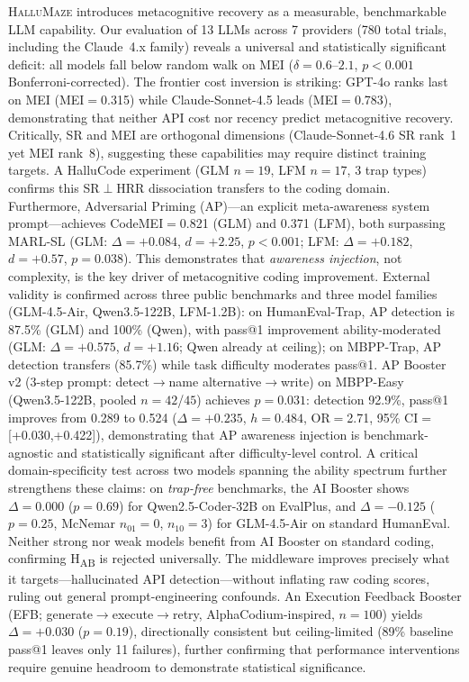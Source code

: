 \documentclass{article}
\begin{document}
\textsc{HalluMaze} introduces metacognitive recovery as a measurable, benchmarkable LLM capability.
Our evaluation of 13 LLMs across 7 providers (780 total trials, including the Claude~4.x family) reveals a universal and statistically significant deficit: all models fall below random walk on MEI ($\delta{=}0.6$--$2.1$, $p{<}0.001$ Bonferroni-corrected).
The frontier cost inversion is striking: GPT-4o ranks last on MEI (MEI$=$0.315) while Claude-Sonnet-4.5 leads (MEI$=$0.783), demonstrating that neither API cost nor recency predict metacognitive recovery.
Critically, SR and MEI are orthogonal dimensions (Claude-Sonnet-4.6 SR rank~1 yet MEI rank~8), suggesting these capabilities may require distinct training targets.
A HalluCode experiment (GLM $n{=}19$, LFM $n{=}17$, 3 trap types) confirms this SR$\perp$HRR dissociation transfers to the coding domain.
Furthermore, Adversarial Priming (AP)---an explicit meta-awareness system prompt---achieves CodeMEI$=$0.821 (GLM) and 0.371 (LFM), both surpassing MARL-SL (GLM: $\Delta{=}+0.084$, $d{=}+2.25$, $p{<}0.001$; LFM: $\Delta{=}+0.182$, $d{=}+0.57$, $p{=}0.038$).
This demonstrates that \textit{awareness injection}, not complexity, is the key driver of metacognitive coding improvement.
External validity is confirmed across three public benchmarks and three model families (GLM-4.5-Air, Qwen3.5-122B, LFM-1.2B): on HumanEval-Trap, AP detection is 87.5\% (GLM) and 100\% (Qwen), with pass@1 improvement ability-moderated (GLM: $\Delta{=}{+}0.575$, $d{=}{+}1.16$; Qwen already at ceiling); on MBPP-Trap, AP detection transfers (85.7\%) while task difficulty moderates pass@1. AP Booster v2 (3-step prompt: detect$\to$name alternative$\to$write) on MBPP-Easy (Qwen3.5-122B, pooled $n{=}42$/$45$) achieves $p{=}0.031$: detection 92.9\%, pass@1 improves from 0.289 to 0.524 ($\Delta{=}{+}0.235$, $h{=}0.484$, OR$=$2.71, 95\% CI$=$[+0.030,+0.422]), demonstrating that AP awareness injection is benchmark-agnostic and statistically significant after difficulty-level control.
A critical domain-specificity test across two models spanning the ability spectrum further strengthens these claims: on \emph{trap-free} benchmarks, the AI Booster shows $\Delta{=}0.000$ ($p{=}0.69$) for Qwen2.5-Coder-32B on EvalPlus, and $\Delta{=}{-}0.125$ ($p{=}0.25$, McNemar $n_{01}{=}0$, $n_{10}{=}3$) for GLM-4.5-Air on standard HumanEval. Neither strong nor weak models benefit from AI Booster on standard coding, confirming H\textsubscript{AB} is rejected universally. The middleware improves precisely what it targets---hallucinated API detection---without inflating raw coding scores, ruling out general prompt-engineering confounds. An Execution Feedback Booster (EFB; generate$\to$execute$\to$retry, AlphaCodium-inspired, $n{=}100$) yields $\Delta{=}{+}0.030$ ($p{=}0.19$), directionally consistent but ceiling-limited (89\% baseline pass@1 leaves only 11 failures), further confirming that performance interventions require genuine headroom to demonstrate statistical significance.
\end{document}
